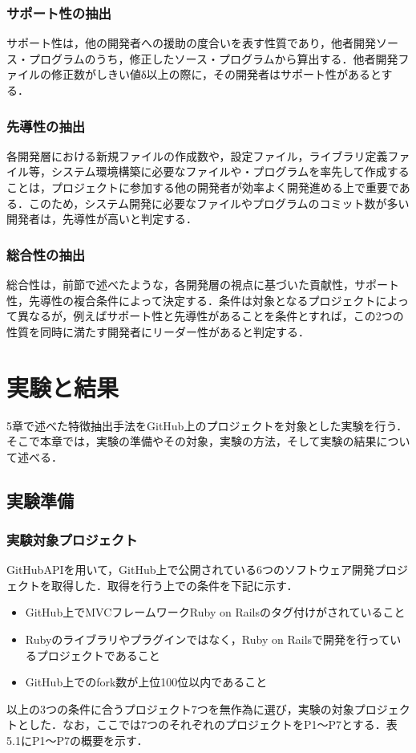 \documentclass{funthesis}
\begin{document}
\subsection{サポート性の抽出}

サポート性は，他の開発者への援助の度合いを表す性質であり，他者開発ソース・プログラムのうち，修正したソース・プログラムから算出する．他者開発ファイルの修正数がしきい値δ以上の際に，その開発者はサポート性があるとする．

\subsection{先導性の抽出}

各開発層における新規ファイルの作成数や，設定ファイル，ライブラリ定義ファイル等，システム環境構築に必要なファイルや・プログラムを率先して作成することは，プロジェクトに参加する他の開発者が効率よく開発進める上で重要である．このため，システム開発に必要なファイルやプログラムのコミット数が多い開発者は，先導性が高いと判定する．

\subsection{総合性の抽出}

総合性は，前節で述べたような，各開発層の視点に基づいた貢献性，サポート性，先導性の複合条件によって決定する．条件は対象となるプロジェクトによって異なるが，例えばサポート性と先導性があることを条件とすれば，この2つの性質を同時に満たす開発者にリーダー性があると判定する．
\chapter{実験と結果}
5章で述べた特徴抽出手法をGitHub上のプロジェクトを対象とした実験を行う．そこで本章では，実験の準備やその対象，実験の方法，そして実験の結果について述べる．
\section{実験準備}
\subsection{実験対象プロジェクト}
GitHubAPIを用いて，GitHub上で公開されている6つのソフトウェア開発プロジェクトを取得した．取得を行う上での条件を下記に示す．
\begin{itemize}
 \item GitHub上でMVCフレームワークRuby on Railsのタグ付けがされていること
 \item Rubyのライブラリやプラグインではなく，Ruby on Railsで開発を行っているプロジェクトであること
 \item GitHub上でのfork数が上位100位以内であること
\end{itemize}
以上の3つの条件に合うプロジェクト7つを無作為に選び，実験の対象プロジェクトとした．なお，ここでは7つのそれぞれのプロジェクトをP1〜P7とする．表5.1にP1〜P7の概要を示す．
\end{document}
